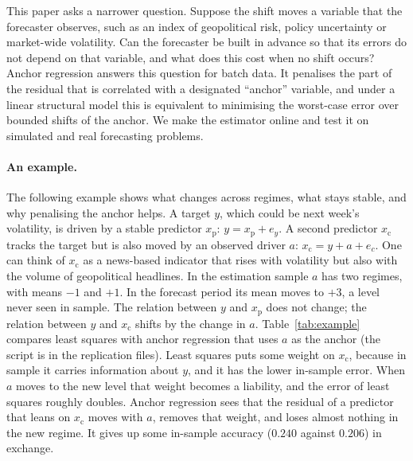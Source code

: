 \documentclass[12pt]{article}
\theoremstyle{plain}
\theoremstyle{remark}
\begin{document}
This paper asks a narrower question. Suppose the shift moves a variable that the
forecaster observes, such as an index of geopolitical risk, policy uncertainty or
market-wide volatility. Can the forecaster be built in advance so that its errors do
not depend on that variable, and what does this cost when no shift occurs? Anchor
regression \citep{rothenhausler2021anchor} answers this question for batch data. It
penalises the part of the residual that is correlated with a designated ``anchor''
variable, and under a linear structural model this is equivalent to minimising the
worst-case error over bounded shifts of the anchor. We make the estimator online and
test it on simulated and real forecasting problems.

\paragraph{An example.}
The following example shows what changes across regimes, what stays stable, and why
penalising the anchor helps. A target $y$, which could be next week's volatility, is
driven by a stable predictor $x_{\mathrm p}$: $y=x_{\mathrm p}+e_y$. A second predictor
$x_{\mathrm c}$ tracks the target but is also moved by an observed driver $a$:
$x_{\mathrm c}=y+a+e_c$. One can think of $x_{\mathrm c}$ as a news-based indicator
that rises with volatility but also with the volume of geopolitical headlines. In the
estimation sample $a$ has two regimes, with means $-1$ and $+1$. In the forecast period
its mean moves to $+3$, a level never seen in sample. The relation between $y$ and
$x_{\mathrm p}$ does not change; the relation between $y$ and $x_{\mathrm c}$ shifts by
the change in $a$. Table~\ref{tab:example} compares least squares with anchor
regression that uses $a$ as the anchor (the script is in the replication files). Least
squares puts some weight on $x_{\mathrm c}$, because in sample it carries information
about $y$, and it has the lower in-sample error. When $a$ moves to the new level that
weight becomes a liability, and the error of least squares roughly doubles. Anchor
regression sees that the residual of a predictor that leans on $x_{\mathrm c}$ moves
with $a$, removes that weight, and loses almost nothing in the new regime. It gives up
some in-sample accuracy ($0.240$ against $0.206$) in exchange.
\end{document}
